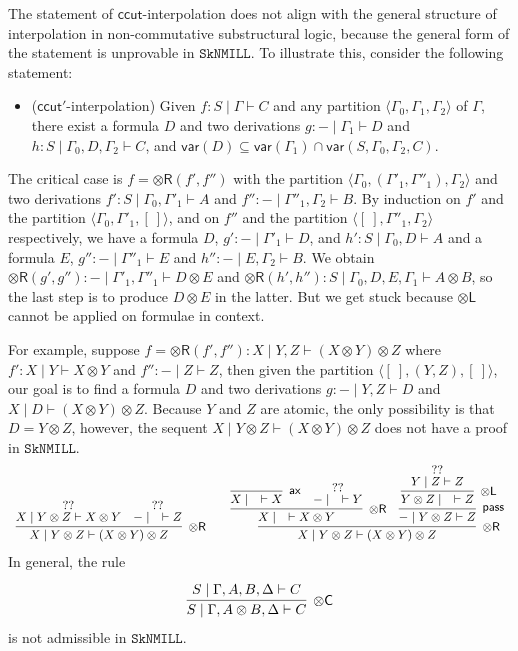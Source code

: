 \documentclass[sn-mathphys-num]{sn-jnl}%
\newcommand{\GG}{\Gamma}
\newcommand{\GD}{\Delta}
\newcommand{\tl}{\otimes \mathsf{L}}
\newcommand{\tr}{\otimes\mathsf{R}}
\newcommand{\pass}{\mathsf{pass}}
\newcommand{\ax}{\mathsf{ax}}
\newcommand{\ot}{\otimes}
\newcommand{\vdG}{\vdash}
\newcommand{\SkNMILL}{$\mathtt{SkNMILL}$}
\newcommand{\mf}[1]{\mathsf{#1}}
\newcommand{\vars}[1]{\mathsf{var}(#1)}
\theoremstyle{thmstyleone}%
\theoremstyle{thmstyletwo}%
\theoremstyle{thmstylethree}%
\begin{document}
The statement of $\mf{ccut}$-interpolation does not align with the general structure of interpolation in non-commutative substructural logic, because the general form of the statement is unprovable in \SkNMILL.
To illustrate this, consider the following statement:
\begin{itemize}
  \item[\ ] ($\mf{ccut'}$-interpolation) Given $f: S \mid \Gamma \vdG C$ and any partition $\langle \GG_0,\GG_1, \GG_2 \rangle$ of $\GG$, there exist a formula $D$ and two derivations  $g : {-} \mid \GG_1 \vdG D$ and $h : S \mid \GG_0, D, \GG_2 \vdG C$, and $\vars{D} \subseteq \vars{\GG_1} \cap \vars{S, \GG_0, \GG_2, C}$.
\end{itemize}
The critical case is $f = \tr (f',f'')$ with the partition $\langle \GG_0, (\GG'_1, \GG''_1), \GG_2\rangle$ and two derivations $f' : S \mid \GG_0 , \GG'_1 \vdG A$ and $f'' : {-} \mid \GG''_1 , \GG_2 \vdG B$.
By induction on $f'$ and the partition $\langle \GG_0 , \GG'_1, [\ ] \rangle$, and on $f''$ and the partition $\langle [\ ], \GG''_1, \GG_2\rangle$ respectively, we have a formula $D$, $g' : {-} \mid \GG'_1 \vdG D$, and $h': S \mid \GG_0 , D \vdG A$ and a formula $E$, $g'' : {-} \mid \GG''_1 \vdG E$ and $h'': {-} \mid E, \GG_2 \vdG B$.
We obtain $\tr (g',g'') : {-} \mid \GG'_1, \GG''_1 \vdG D \ot E$ and $\tr (h', h'') : S \mid \GG_0, D, E, \GG_1 \vdG A \ot B$, so the last step is to produce $D \ot E$ in the latter.
But we get stuck because $\tl$ cannot be applied on formulae in context.

For example, suppose $f = \tr (f',f''): X \mid Y, Z \vdG (X\ot Y)\ot Z$ where $f':X \mid Y \vdG X\ot Y$ and $f'': {-} \mid Z \vdG Z$, then given the partition $\langle [\ ], (Y,Z), [\ ]\rangle$, our goal is to find a formula $D$ and two derivations $g: {-} \mid Y, Z \vdG D$ and $X \mid D \vdG (X\ot Y)\ot Z$.
Because $Y$ and $Z$ are atomic, the only possibility is that $D = Y \ot Z$, however, the sequent $X \mid Y \ot Z \vdG (X \ot Y) \ot Z$ does not have a proof in \SkNMILL.
\begin{equation*}\label{example:ccut:failure}
  \small\begin{array}{c}
    \infer[\tr]{X \mid Y \ot Z \vdG (X \ot Y) \ot Z}{
    \deduce{X \mid Y\ot Z \vdG X \ot Y}{??}
    &
    \deduce{{-} \mid \quad \vdG Z}{??}
  }
  \qquad
  \infer[\tr]{X \mid Y \ot Z \vdG (X \ot Y) \ot Z}{
    \infer[\tr]{X \mid \quad \vdG X \ot Y}{
      \infer[\ax]{X \mid \quad \vdG X}{}
      &
      \deduce{{-} \mid \quad \vdG Y}{??}
    }
    &
    \infer[\pass]{{-} \mid Y \ot Z \vdG Z}{
      \infer[\tl]{Y \ot Z \mid \quad \vdG Z}{
        \deduce{Y \mid Z \vdG Z}{??}
      }
    }
  }
  \end{array}
\end{equation*}
In general, the rule
\begin{displaymath}
\begin{array}{c}
  \infer[\ot\mf{C}]{S \mid \GG , A \ot B , \GD \vdG C}{
    \deduce{S \mid \GG, A , B , \GD \vdG C}{}
  }
\end{array}
\end{displaymath}
is not admissible in \SkNMILL.
\end{document}

